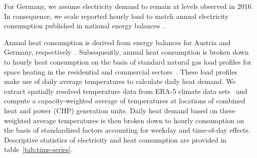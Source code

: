 \documentclass[review, 3p, times]{elsarticle} %
\begin{document}
    For Germany, we assume electricity demand to remain at levels observed in 2016.
    In consequence, we scale reported hourly load to match annual electricity consumption published in national energy
    balances~\citep{AGEB}.

    Annual heat consumption is derived from energy balances for Austria and Germany, respectively~\citep{AGEB, OeSTAT2019}.
    Subsequently, annual heat consumption is broken down to hourly heat consumption on the basis of standard natural gas
    load profiles for space heating in the residential and commercial sectors~\citep{Almbauer2008}.
    These load profiles make use of daily average temperatures to calculate daily heat demand.
    We extract spatially resolved temperature data from ERA-5 climate data sets~\citep{era-5} and compute a
    capacity-weighted average of temperatures at locations of combined heat and power (CHP) generation units.
    Daily heat demand based on these weighted average temperatures is then broken down to hourly consumption on the
    basis of standardized factors accounting for weekday and time-of-day effects.
    Descriptive statistics of electricity and heat consumption are provided in table~\ref{tab:time-series}.
\end{document}

